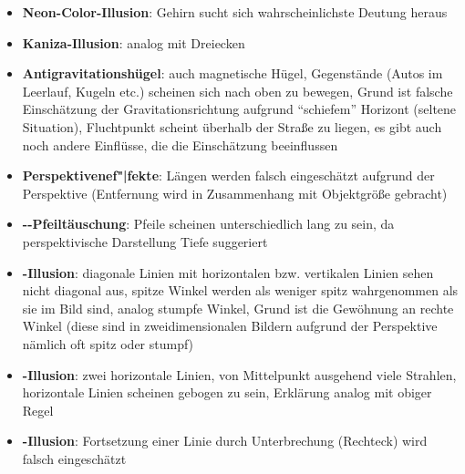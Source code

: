 \linie
\begin{itemize}
    \item
    \textbf{Neon-Color-Illusion}:
    Gehirn sucht sich wahrscheinlichste Deutung heraus

    \item
    \textbf{Kaniza-Illusion}:
    analog mit Dreiecken
\end{itemize}
\linie
\begin{itemize}
    \item
    \textbf{Antigravitationshügel}:
    auch magnetische Hügel,
    Gegenstände (Autos im Leerlauf, Kugeln etc.) scheinen sich nach oben
    zu bewegen,
    Grund ist falsche Einschätzung der Gravitationsrichtung aufgrund
    "`schiefem"' Horizont (seltene Situation),
    Fluchtpunkt scheint überhalb der Straße zu liegen,
    es gibt auch noch andere Einflüsse, die die Einschätzung beeinflussen
\end{itemize}
\linie
\begin{itemize}
    \item
    \textbf{Perspektivenef"|fekte}:
    Längen werden falsch eingeschätzt aufgrund der Perspektive
    (Entfernung wird in Zusammenhang mit Objektgröße gebracht)

    \item
    \textbf{--Pfeiltäuschung}:
    Pfeile scheinen unterschiedlich lang zu sein,
    da perspektivische Darstellung Tiefe suggeriert

    \item
    \textbf{-Illusion}:
    diagonale Linien mit horizontalen bzw. vertikalen Linien
    sehen nicht diagonal aus,
    spitze Winkel werden als weniger spitz wahrgenommen als sie im Bild sind,
    analog stumpfe Winkel,
    Grund ist die Gewöhnung an rechte Winkel
    (diese sind in zweidimensionalen Bildern aufgrund der Perspektive
    nämlich oft spitz oder stumpf)

    \item
    \textbf{-Illusion}:
    zwei horizontale Linien, von Mittelpunkt ausgehend viele Strahlen,
    horizontale Linien scheinen gebogen zu sein,
    Erklärung analog mit obiger Regel

    \item
    \textbf{-Illusion}:
    Fortsetzung einer Linie durch Unterbrechung (Rechteck) wird falsch
    eingeschätzt
\end{itemize}

\pagebreak
